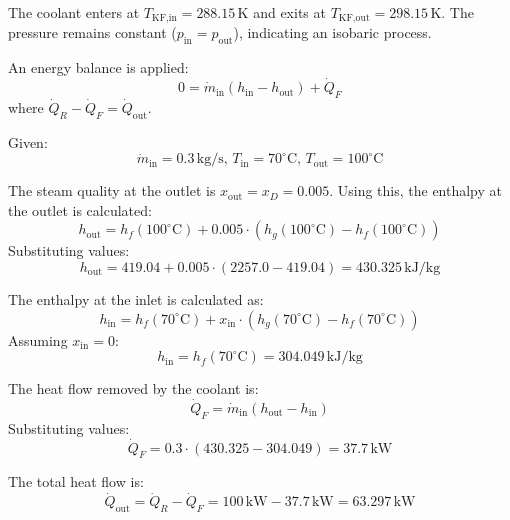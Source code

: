 The coolant enters at \( T_{\text{KF,in}} = 288.15 \, \text{K} \) and exits at \( T_{\text{KF,out}} = 298.15 \, \text{K} \). The pressure remains constant (\( p_{\text{in}} = p_{\text{out}} \)), indicating an isobaric process.  

An energy balance is applied:  
\[
0 = \dot{m}_{\text{in}} (h_{\text{in}} - h_{\text{out}}) + \dot{Q}_F
\]  
where \( \dot{Q}_R - \dot{Q}_F = \dot{Q}_{\text{out}} \).  

Given:  
\[
\dot{m}_{\text{in}} = 0.3 \, \text{kg/s}, \, T_{\text{in}} = 70^\circ\text{C}, \, T_{\text{out}} = 100^\circ\text{C}
\]  

The steam quality at the outlet is \( x_{\text{out}} = x_D = 0.005 \). Using this, the enthalpy at the outlet is calculated:  
\[
h_{\text{out}} = h_f(100^\circ\text{C}) + 0.005 \cdot (h_g(100^\circ\text{C}) - h_f(100^\circ\text{C}))
\]  
Substituting values:  
\[
h_{\text{out}} = 419.04 + 0.005 \cdot (2257.0 - 419.04) = 430.325 \, \text{kJ/kg}
\]  

The enthalpy at the inlet is calculated as:  
\[
h_{\text{in}} = h_f(70^\circ\text{C}) + x_{\text{in}} \cdot (h_g(70^\circ\text{C}) - h_f(70^\circ\text{C}))
\]  
Assuming \( x_{\text{in}} = 0 \):  
\[
h_{\text{in}} = h_f(70^\circ\text{C}) = 304.049 \, \text{kJ/kg}
\]  

The heat flow removed by the coolant is:  
\[
\dot{Q}_F = \dot{m}_{\text{in}} (h_{\text{out}} - h_{\text{in}})
\]  
Substituting values:  
\[
\dot{Q}_F = 0.3 \cdot (430.325 - 304.049) = 37.7 \, \text{kW}
\]  

The total heat flow is:  
\[
\dot{Q}_{\text{out}} = \dot{Q}_R - \dot{Q}_F = 100 \, \text{kW} - 37.7 \, \text{kW} = 63.297 \, \text{kW}
\]